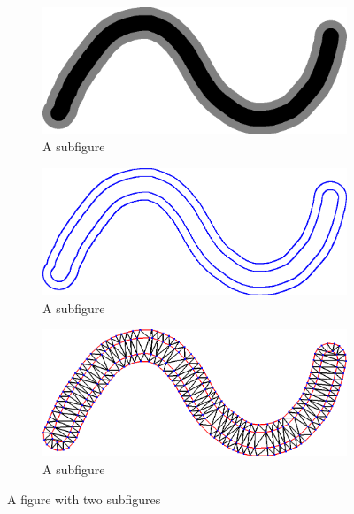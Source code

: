 \documentclass[conference]{acmsiggraph}
\begin{document}
\begin{figure}
\centering
\begin{subfigure}[b]{0.3\textwidth}
  \centering
  \includegraphics[width=.9\textwidth]{images/stroke_triangulation/softrendered}
  \caption{A subfigure}
  \label{fig:sub1}
\end{subfigure}%
\begin{subfigure}[b]{0.3\textwidth}
  \centering
  \includegraphics[width=.9\textwidth]{images/stroke_triangulation/softpruned}
  \caption{A subfigure}
  \label{fig:sub2}
\end{subfigure}
\begin{subfigure}[b]{0.3\textwidth}
  \centering
  \includegraphics[width=.9\textwidth]{images/stroke_triangulation/softmesh}
  \caption{A subfigure}
  \label{fig:sub2}
\end{subfigure}
\caption{A figure with two subfigures}
\label{fig:test}
\end{figure}


\end{document}
